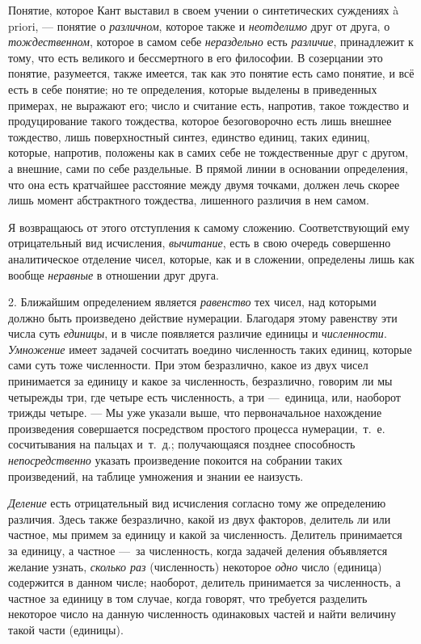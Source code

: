 Понятие, которое Кант выставил в своем учении о синтетических суждениях à
priori, — понятие о {\em различном}, которое также и
{\em неотделимо} друг от друга, о
{\em тождественном}, которое в самом себе
{\em нераздельно} есть
{\em различие}, принадлежит к тому, что есть великого и
бессмертного в его философии. В созерцании это понятие, разумеется, также
имеется, так как это понятие есть само понятие, и всё есть в себе понятие;
но те определения, которые выделены в приведенных примерах, не выражают
его; число и считание есть, напротив, такое тождество и продуцирование
такого тождества, которое безоговорочно есть лишь внешнее тождество, лишь
поверхностный синтез, единство единиц, таких единиц, которые, напротив,
положены как в самих себе не тождественные друг с другом, а внешние, сами
по себе раздельные. В прямой линии в основании определения, что она есть
кратчайшее расстояние между двумя точками, должен лечь скорее лишь момент
абстрактного тождества, лишенного различия в нем самом.

Я возвращаюсь от этого отступления к самому сложению. Соответствующий ему
отрицательный вид исчисления, {\em вычитание}, есть в
свою очередь совершенно аналитическое отделение чисел, которые, как и в
сложении, определены лишь как вообще {\em неравные} в
отношении друг друга.

2. Ближайшим определением является {\em равенство} тех
чисел, над которыми должно быть произведено действие нумерации. Благодаря
этому равенству эти числа суть {\em единицы}, и в числе
появляется различие единицы и {\em численности}.
{\em Умножение} имеет задачей сосчитать воедино
численность таких единиц, которые сами суть тоже численности. При этом
безразлично, какое из двух чисел принимается за единицу и какое за
численность, безразлично, говорим ли мы четырежды три, где четыре есть
численность, а три —~единица, или, наоборот трижды четыре. — Мы уже указали
выше, что первоначальное нахождение произведения совершается посредством
простого процесса нумерации,~т.~е. сосчитывания на пальцах и~т.~д.;
получающаяся позднее способность {\em непосредственно}
указать произведение покоится на собрании таких произведений, на таблице
умножения и знании ее наизусть.

{\em Деление} есть отрицательный вид исчисления согласно
тому же определению различия. Здесь также безразлично, какой из двух
факторов, делитель ли или частное, мы примем за единицу и какой за
численность. Делитель принимается за единицу, а частное —~за численность,
когда задачей деления объявляется желание узнать,
{\em сколько раз} (численность) некоторое
{\em одно} число (единица) содержится в данном числе;
наоборот, делитель принимается за численность, а частное за единицу в том
случае, когда говорят, что требуется разделить некоторое число на данную
численность одинаковых частей и найти величину такой части (единицы).

